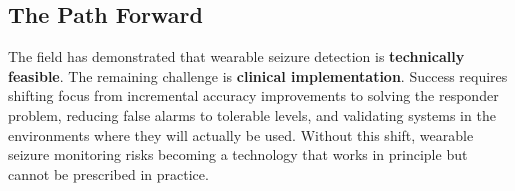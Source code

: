 \subsection{The Path Forward}

The field has demonstrated that wearable seizure detection is \textbf{technically feasible}. The remaining challenge is \textbf{clinical implementation}. Success requires shifting focus from incremental accuracy improvements to solving the responder problem, reducing false alarms to tolerable levels, and validating systems in the environments where they will actually be used. Without this shift, wearable seizure monitoring risks becoming a technology that works in principle but cannot be prescribed in practice.
